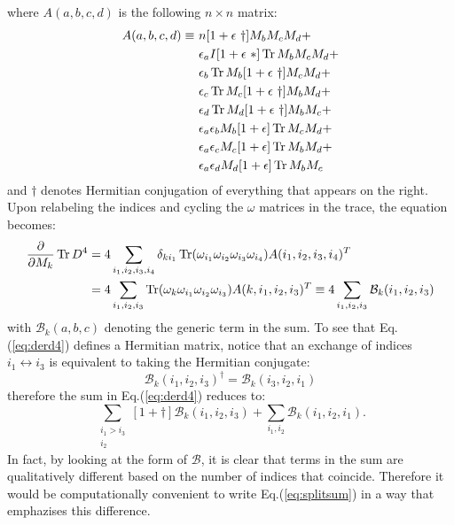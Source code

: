where $A(a, b, c, d )$ is the following $n \times n$ matrix:
\begin{align}
A(a,b,c,d) \equiv \ &n [1+\epsilon \ \dagger] M_b M_c M_d + \notag \\
&\epsilon_a I [1 + \epsilon \ *] \operatorname{Tr} M_b M_c M_d  + \notag \\
&\epsilon_b \operatorname{Tr} M_b [1 + \epsilon \ \dagger] M_c M_d + \notag \\
&\epsilon_c \operatorname{Tr} M_c [1 + \epsilon \ \dagger] M_b M_d + \notag \\
&\epsilon_d \operatorname{Tr} M_d [1 + \epsilon \ \dagger] M_b M_c + \notag \\
&\epsilon_a \epsilon_b M_b [1 + \epsilon] \operatorname{Tr} M_c M_d + \notag \\
&\epsilon_a \epsilon_c M_c [1 + \epsilon] \operatorname{Tr} M_b M_d + \notag \\
&\epsilon_a \epsilon_d M_d [1 + \epsilon] \operatorname{Tr} M_b M_c
\end{align}
and $\dagger$ denotes Hermitian conjugation of everything that appears on the right. Upon relabeling the indices and cycling the $\omega$ matrices in the trace, the equation becomes:
\begin{align}\label{eq:derd4}
\frac{\partial}{\partial M_k} \operatorname{Tr} D^4 &= 4 \sum_{i_1, i_2, i_3, i_4} \delta_{ki_1} \operatorname{Tr} (\omega_{i_1} \omega_{i_2} \omega_{i_3} \omega_{i_4}) A(i_1, i_2, i_3, i_4)^T \notag \\
&= 4 \sum_{i_1, i_2, i_3} \operatorname{Tr} (\omega_{k} \omega_{i_1} \omega_{i_2} \omega_{i_3}) A(k, i_1, i_2, i_3)^T \equiv 4 \sum_{i_1, i_2, i_3} \mathcal{B}_k(i_1, i_2, i_3)
\end{align}
with $\mathcal{B}_k(a, b, c)$ denoting the generic term in the sum.\newline
To see that Eq.(\ref{eq:derd4}) defines a Hermitian matrix, notice that an exchange of indices $i_1 \leftrightarrow i_3$ is equivalent to taking the Hermitian conjugate:
\begin{equation}\label{eq:BBd}
\mathcal{B}_k(i_1, i_2, i_3)^{\dagger} = \mathcal{B}_k(i_3, i_2, i_1)
\end{equation}
therefore the sum in Eq.(\ref{eq:derd4}) reduces to:
\begin{equation}\label{eq:splitsum}
\sum_{\substack{i_1 > i_3 \\ i_2}} [1+\dagger] \mathcal{B}_k(i_1, i_2, i_3) + \sum_{i_1, i_2} \mathcal{B}_k(i_1, i_2, i_1).
\end{equation}
In fact, by looking at the form of $\mathcal{B}$, it is clear that terms in the sum are qualitatively different based on the number of indices that coincide. Therefore it would be computationally convenient to write Eq.(\ref{eq:splitsum}) in a way that emphazises this difference.\newline
